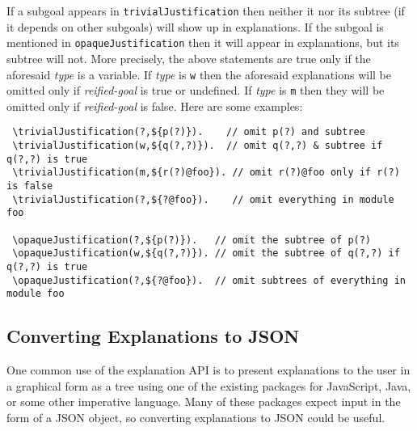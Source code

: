 If a subgoal appears in \texttt{\bs{}trivialJustification} then neither it
nor its subtree (if it depends on other subgoals)
will show up in explanations. If the subgoal is mentioned in
\texttt{\bs{}opaqueJustification}
then it will appear in explanations, but its subtree will not.
More precisely, the above statements are true only if the aforesaid
\emph{type} is a variable. If \emph{type} is \texttt{w} then the
aforesaid explanations will be omitted only if \emph{reified-goal} is true
or undefined.
If \emph{type} is \texttt{m} then they will be omitted only if
\emph{reified-goal} is false. 
Here are some examples:

\begin{verbatim}
 \trivialJustification(?,${p(?)}).    // omit p(?) and subtree
 \trivialJustification(w,${q(?,?)}).  // omit q(?,?) & subtree if q(?,?) is true
 \trivialJustification(m,${r(?)@foo}). // omit r(?)@foo only if r(?) is false
 \trivialJustification(?,${?@foo}).    // omit everything in module foo

 \opaqueJustification(?,${p(?)}).   // omit the subtree of p(?)
 \opaqueJustification(w,${q(?,?)}). // omit the subtree of q(?,?) if q(?,?) is true
 \opaqueJustification(?,${?@foo}).  // omit subtrees of everything in module foo
\end{verbatim}

\subsection{Converting Explanations to JSON}

One common use of the explanation API is to present explanations to the
user in a graphical form as a tree using one of the existing packages for
JavaScript, Java, or some other imperative language. Many of these packages
expect input in the form of a JSON object, so converting explanations to
JSON could be useful.

